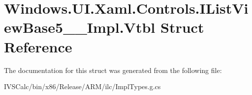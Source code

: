 \hypertarget{struct_windows_1_1_u_i_1_1_xaml_1_1_controls_1_1_i_list_view_base5_____impl_1_1_vtbl}{}\section{Windows.\+U\+I.\+Xaml.\+Controls.\+I\+List\+View\+Base5\+\_\+\+\_\+\+Impl.\+Vtbl Struct Reference}
\label{struct_windows_1_1_u_i_1_1_xaml_1_1_controls_1_1_i_list_view_base5_____impl_1_1_vtbl}


The documentation for this struct was generated from the following file\+:\begin{DoxyCompactItemize}
\item 
I\+V\+S\+Calc/bin/x86/\+Release/\+A\+R\+M/ilc/Impl\+Types.\+g.\+cs\end{DoxyCompactItemize}
